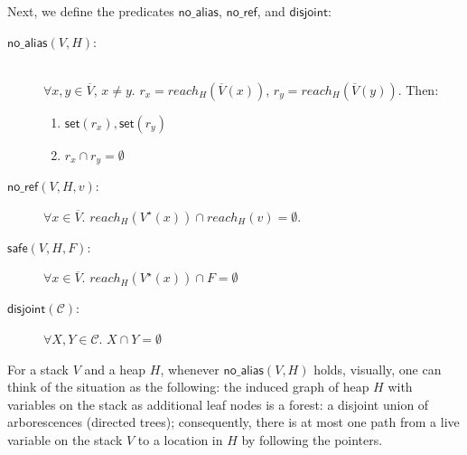 \documentclass[11pt]{article}
\newcommand{\ms}[1]{\ensuremath{\mathsf{#1}}}
\newcommand{\na}[1]{\mathsf{no\_alias}(#1)}
\newcommand{\dist}[1]{\mathsf{disjoint}(#1)}
\begin{document}
\noindent
Next, we define the predicates $\ms{no\_alias}$, $\ms{no\_ref}$, and $\ms{disjoint}$:
\begin{description}
\item[$\na{V,H}$: ] \\
$\forall x,y \in \overline V$, $x \ne y$.  $r_x = reach_H(\overline V(x))$, $r_y = reach_H(\overline V(y))$. Then:
\begin{enumerate}
\item $\ms{set}(r_x), \ms{set}(r_y)$
\item $r_x \cap r_y = \emptyset$
\end{enumerate}
\item[$\ms{no\_ref}(V,H,v)$: ] $\forall x \in \overline V$. $reach_{H}(V^{\star}(x)) \cap reach_{H}(v) = \emptyset$.
\item [$\ms{safe}(V,H,F)$: ] $\forall x \in \overline V$. $reach_{H}(V^{\star}(x)) \cap F = \emptyset$
\item[$\dist{\mathcal{C}}$: ] $\forall X,Y \in \mathcal{C}$. $X \cap Y = \emptyset$ 
\end{description}

\noindent
For a stack $V$ and a heap $H$, whenever $\na{V,H}$ holds, visually, one can think of the situation as the following: the induced graph of heap $H$ with variables on the stack as additional leaf nodes is a forest: a disjoint union of arborescences (directed trees); consequently, there is at most one path from a live variable on the stack $V$ to a location in $H$ by following the pointers.\\
\end{document}
